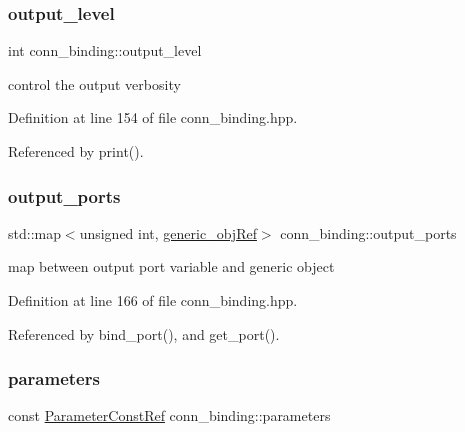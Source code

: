 \subsubsection{\texorpdfstring{output\+\_\+level}{output\_level}}
{\footnotesize\ttfamily int conn\+\_\+binding\+::output\+\_\+level\hspace{0.3cm}{\ttfamily [protected]}}



control the output verbosity 



Definition at line 154 of file conn\+\_\+binding.\+hpp.



Referenced by print().

\mbox{\label{classconn__binding_af6e110c11925ff778bb1f895d1dc078f}} 
\subsubsection{\texorpdfstring{output\+\_\+ports}{output\_ports}}
{\footnotesize\ttfamily std\+::map$<$unsigned int, \hyperlink{generic__obj_8hpp_acb533b2ef8e0fe72e09a04d20904ca81}{generic\+\_\+obj\+Ref}$>$ conn\+\_\+binding\+::output\+\_\+ports\hspace{0.3cm}{\ttfamily [protected]}}



map between output port variable and generic object 



Definition at line 166 of file conn\+\_\+binding.\+hpp.



Referenced by bind\+\_\+port(), and get\+\_\+port().

\mbox{\label{classconn__binding_a2fea3ae9e3d6941856636531c50c6ff6}} 
\subsubsection{\texorpdfstring{parameters}{parameters}}
{\footnotesize\ttfamily const \hyperlink{Parameter_8hpp_a37841774a6fcb479b597fdf8955eb4ea}{Parameter\+Const\+Ref} conn\+\_\+binding\+::parameters\hspace{0.3cm}{\ttfamily [protected]}}



